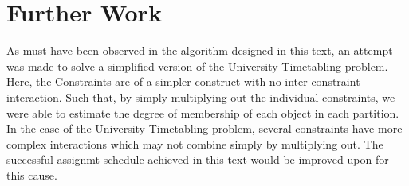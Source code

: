\documentclass[a4paper,openany]{book}
\begin{document}
		\section{Further Work}
			As must have been observed in the algorithm designed in this text, an attempt was made to solve a simplified version of the University Timetabling problem. Here, the Constraints are of a simpler construct with no inter-constraint interaction. Such that, by simply multiplying out the individual constraints, we were able to estimate the degree of membership of each object in each partition. In the case of the University Timetabling problem, several constraints have more complex interactions which may not combine simply by multiplying out. The successful assignmt schedule achieved in this text would be improved upon for this cause.
	\newpage
	\renewcommand\bibname{References}
	
	
\end{document}
